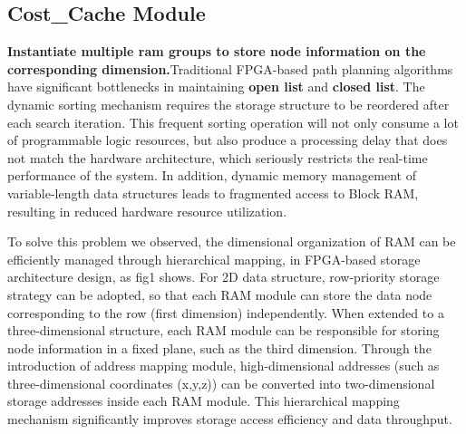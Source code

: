 \subsection{Cost\_Cache Module}
\textbf{Instantiate multiple ram groups to store node information on the corresponding dimension.}Traditional FPGA-based path planning algorithms have significant bottlenecks in maintaining \textbf{open list} and \textbf{closed list}.
The dynamic sorting mechanism requires the storage structure to be reordered after each search iteration. This frequent sorting operation will not only consume a lot of programmable logic resources, but also produce a processing delay that does not match the hardware architecture, which seriously restricts the real-time performance of the system.
In addition, dynamic memory management of variable-length data structures leads to fragmented access to Block RAM, resulting in reduced hardware resource utilization.

To solve this problem we observed, the dimensional organization of RAM can be efficiently managed through hierarchical mapping, in FPGA-based storage architecture design, as fig1 shows.
For 2D data structure, row-priority storage strategy can be adopted, so that each RAM module can store the data node corresponding to the row (first dimension) independently.
When extended to a three-dimensional structure, each RAM module can be responsible for storing node information in a fixed plane, such as the third dimension.
Through the introduction of address mapping module, high-dimensional addresses (such as three-dimensional coordinates (x,y,z)) can be converted into two-dimensional storage addresses inside each RAM module. This hierarchical mapping mechanism significantly improves storage access efficiency and data throughput.





